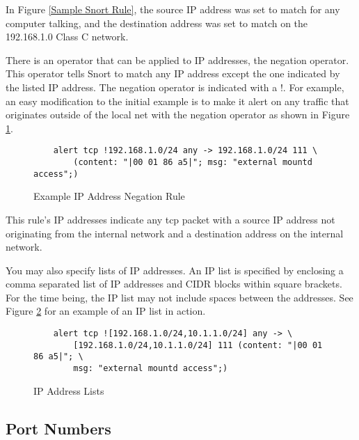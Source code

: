 \documentclass[english]{report}
\begin{document}
In Figure \ref{Sample Snort Rule}, the source IP address was set to match for
any computer talking, and the destination address was set to match on the
192.168.1.0 Class C network.

There is an operator that can be applied to IP addresses, the negation
operator. This operator tells Snort to match any IP address except the one
indicated by the listed IP address. The negation operator is indicated with a
!. For example, an easy modification to the initial example is to make it alert
on any traffic that originates outside of the local net with the negation
operator as shown in Figure \ref{Example Negation}.

\begin{center}
\begin{figure}
\begin{verbatim}
    alert tcp !192.168.1.0/24 any -> 192.168.1.0/24 111 \
        (content: "|00 01 86 a5|"; msg: "external mountd access";)
\end{verbatim}

\caption{\label{Example Negation} Example IP Address Negation Rule}
\end{figure}
\end{center}

This rule's IP addresses indicate any tcp packet with a source IP address not
originating from the internal network and a destination address on the internal
network.

You may also specify lists of IP addresses. An IP list is specified by
enclosing a comma separated list of IP addresses and CIDR blocks within square
brackets. For the time being, the IP list may not include spaces between the
addresses. See Figure \ref{IP list usage} for an example of an IP list in
action.

\begin{center}
\begin{figure}
\begin{verbatim}
    alert tcp ![192.168.1.0/24,10.1.1.0/24] any -> \
        [192.168.1.0/24,10.1.1.0/24] 111 (content: "|00 01 86 a5|"; \
        msg: "external mountd access";)
\end{verbatim}

\caption{\label{IP list usage}IP Address Lists}
\end{figure}
\end{center}

\subsection{Port Numbers}
\end{document}
